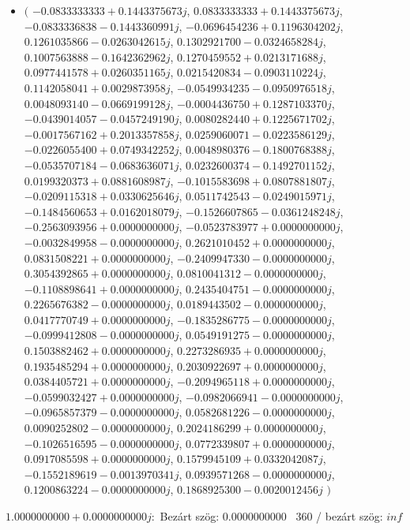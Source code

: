 \documentclass[14pt,a4paper]{article}
\begin{document}
\begin{itemize}
\item
$\big($
$-0.0833333333+0.1443375673j$, $0.0833333333+0.1443375673j$, $-0.0833336838-0.1443360991j$, $-0.0696454236+0.1196304202j$, $0.1261035866-0.0263042615j$, $0.1302921700-0.0324658284j$, $0.1007563888-0.1642362962j$, $0.1270459552+0.0213171688j$, $0.0977441578+0.0260351165j$, $0.0215420834-0.0903110224j$, $0.1142058041+0.0029873958j$, $-0.0549934235-0.0950976518j$, $0.0048093140-0.0669199128j$, $-0.0004436750+0.1287103370j$, $-0.0439014057-0.0457249190j$, $0.0080282440+0.1225671702j$, $-0.0017567162+0.2013357858j$, $0.0259060071-0.0223586129j$, $-0.0226055400+0.0749342252j$, $0.0048980376-0.1800768388j$, $-0.0535707184-0.0683636071j$, $0.0232600374-0.1492701152j$, $0.0199320373+0.0881608987j$, $-0.1015583698+0.0807881807j$, $-0.0209115318+0.0330625646j$, $0.0511742543-0.0249015971j$, $-0.1484560653+0.0162018079j$, $-0.1526607865-0.0361248248j$, $-0.2563093956+0.0000000000j$, $-0.0523783977+0.0000000000j$, $-0.0032849958-0.0000000000j$, $0.2621010452+0.0000000000j$, $0.0831508221+0.0000000000j$, $-0.2409947330-0.0000000000j$, $0.3054392865+0.0000000000j$, $0.0810041312-0.0000000000j$, $-0.1108898641+0.0000000000j$, $0.2435404751-0.0000000000j$, $0.2265676382-0.0000000000j$, $0.0189443502-0.0000000000j$, $0.0417770749+0.0000000000j$, $-0.1835286775-0.0000000000j$, $-0.0999412808-0.0000000000j$, $0.0549191275-0.0000000000j$, $0.1503882462+0.0000000000j$, $0.2273286935+0.0000000000j$, $0.1935485294+0.0000000000j$, $0.2030922697+0.0000000000j$, $0.0384405721+0.0000000000j$, $-0.2094965118+0.0000000000j$, $-0.0599032427+0.0000000000j$, $-0.0982066941-0.0000000000j$, $-0.0965857379-0.0000000000j$, $0.0582681226-0.0000000000j$, $0.0090252802-0.0000000000j$, $0.2024186299+0.0000000000j$, $-0.1026516595-0.0000000000j$, $0.0772339807+0.0000000000j$, $0.0917085598+0.0000000000j$, $0.1579945109+0.0332042087j$, $-0.1552189619-0.0013970341j$, $0.0939571268-0.0000000000j$, $0.1200863224-0.0000000000j$, $0.1868925300-0.0020012456j$
$\big)$
\end{itemize}
$1.0000000000+0.0000000000j$:\
Bezárt szög: $0.0000000000$ \
360 / bezárt szög: $inf$\
\end{document}
